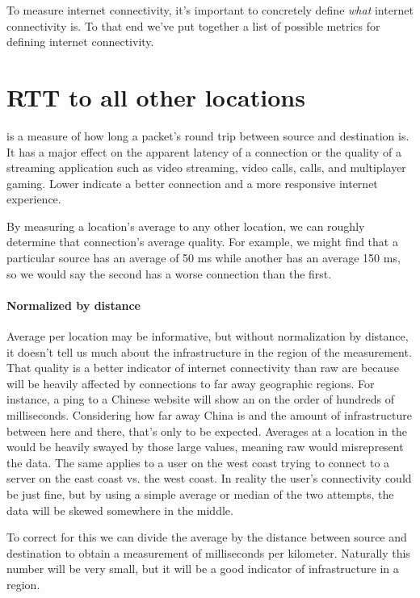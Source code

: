 To measure internet connectivity, it's important to concretely define \textit{what} internet connectivity is. To that end we've put together a list of possible metrics for defining internet connectivity.

\section{RTT to all other locations}
\label{sec:definition_rtt_to_everywhere}

\RTT is a measure of how long a packet's round trip between source and destination is. It has a major effect on the apparent latency of a connection or the quality of a streaming application such as video streaming, video calls, \voip calls, and multiplayer gaming. Lower \rtts indicate a better connection and a more responsive internet experience.

By measuring a location's average \rtt to any other location, we can roughly determine that connection's average quality. For example, we might find that a particular source has an average \rtt of 50 ms while another has an average 150 ms, so we would say the second has a worse connection than the first.

\paragraph{Normalized by distance}
Average \rtt per location may be informative, but without normalization by distance, it doesn't tell us much about the infrastructure in the region of the measurement. That quality is a better indicator of internet connectivity than raw \rtts are because \rtts will be heavily affected by connections to far away geographic regions. For instance, a ping to a Chinese website will show an \rtt on the order of hundreds of milliseconds. Considering how far away China is and the amount of infrastructure between here and there, that's only to be expected. Averages at a location in the \us would be heavily swayed by those large values, meaning raw \rtt would misrepresent the data. The same applies to a user on the west coast trying to connect to a server on the east coast vs. the west coast. In reality the user's connectivity could be just fine, but by using a simple average or median of the two attempts, the data will be skewed somewhere in the middle.

To correct for this we can divide the average \rtt by the distance between source and destination to obtain a measurement of milliseconds per kilometer. Naturally this number will be very small, but it will be a good indicator of infrastructure in a region.

